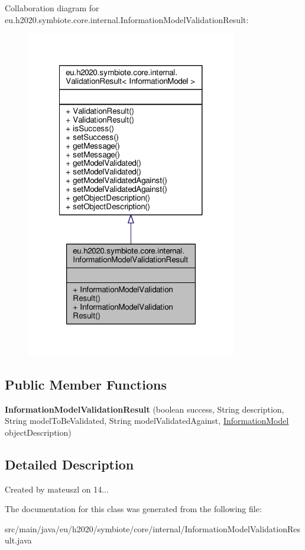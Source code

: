 Collaboration diagram for eu.\+h2020.\+symbiote.\+core.\+internal.\+Information\+Model\+Validation\+Result\+:
\nopagebreak
\begin{figure}[H]
\begin{center}
\leavevmode
\includegraphics[width=260pt]{classeu_1_1h2020_1_1symbiote_1_1core_1_1internal_1_1InformationModelValidationResult__coll__graph}
\end{center}
\end{figure}
\subsection*{Public Member Functions}
\begin{DoxyCompactItemize}
\item 
\mbox{\label{classeu_1_1h2020_1_1symbiote_1_1core_1_1internal_1_1InformationModelValidationResult_ab423dc1f089e6ec2c4205439e72b0756}} 
{\bfseries Information\+Model\+Validation\+Result} (boolean success, String description, String model\+To\+Be\+Validated, String model\+Validated\+Against, \hyperlink{classeu_1_1h2020_1_1symbiote_1_1model_1_1mim_1_1InformationModel}{Information\+Model} object\+Description)
\end{DoxyCompactItemize}


\subsection{Detailed Description}
Created by mateuszl on 14... 

The documentation for this class was generated from the following file\+:\begin{DoxyCompactItemize}
\item 
src/main/java/eu/h2020/symbiote/core/internal/Information\+Model\+Validation\+Result.\+java\end{DoxyCompactItemize}
